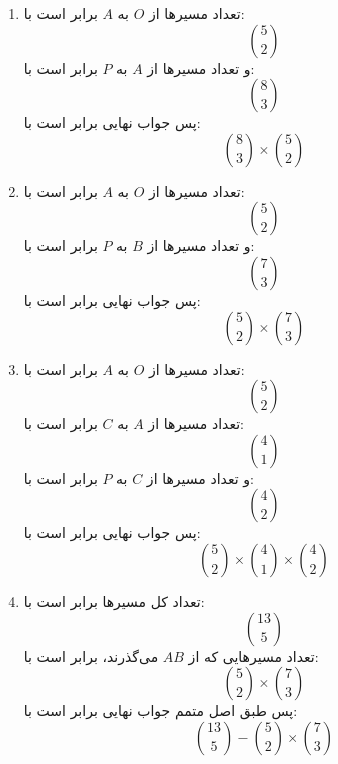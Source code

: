         \p
\begin{enumerate}
\item
تعداد مسیرها از
$O$
به
$A$
برابر است با:
$$\binom 5 2$$
و تعداد مسیرها از
$A$
به
$P$
برابر است با:
$$\binom 8 3$$
پس جواب نهایی برابر است با:
$$\binom8 3 \times \binom 5 2$$
\item
تعداد مسیرها از
$O$
به
$A$
برابر است با:
$$\binom 5 2$$
و تعداد مسیرها از
$B$
به
$P$
برابر است با:
$$\binom 7 3$$
پس جواب نهایی برابر است با:
$$\binom 5 2 \times \binom 7 3$$
\item
تعداد مسیرها از
$O$
به
$A$
برابر است با:
$$\binom 5 2$$
تعداد مسیرها از
$A$
به
$C$
برابر است با:
$$\binom 4 1$$
و تعداد مسیرها از
$C$
به
$P$
برابر است با:
$$\binom 4 2$$
پس جواب نهایی برابر است با:
$$\binom 5 2 \times \binom 4 1 \times \binom 4 2$$
\item
تعداد کل مسیرها برابر است با:
$$\binom{13}{5}$$
تعداد مسیرهایی که از
$AB$
می‌گذرند، برابر است با:
$$\binom{5}{2} \times \binom 7 3$$
پس طبق اصل متمم جواب نهایی برابر است با:
$$\binom{13}{5} - \binom 5 2 \times \binom 7 3$$
\end{enumerate}